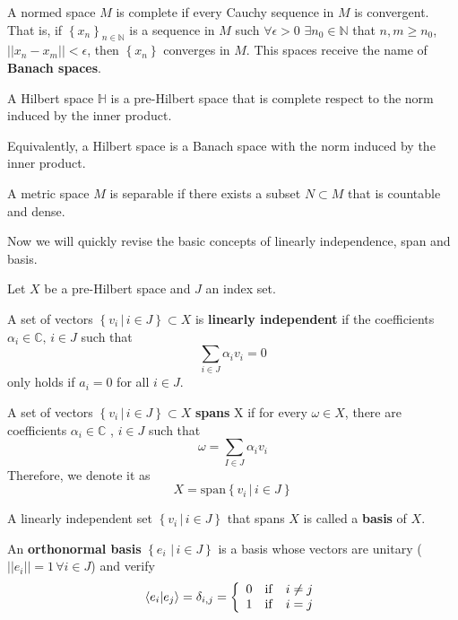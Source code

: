 \begin{definicion}
    A normed space $M$ is complete if every Cauchy sequence in $M$ is convergent. That is, if $\left\lbrace x_n\right\rbrace_{n \in \mathbb{N}}$ is a sequence in $M$ such $\forall \epsilon >0\,\,\exists n_0 \in \mathbb{N}$ that $n,m \geq n_0$, $||x_n - x_m|| < \epsilon$, then $\left\lbrace x_n \right\rbrace$ converges in $M$. 
    This spaces receive the name of \textbf{Banach spaces}. 
\end{definicion}

\begin{definicion} 
    A Hilbert space $\mathbb{H}$ is a pre-Hilbert space that is complete respect to the norm induced by the inner product.
\end{definicion}

Equivalently, a Hilbert space is a Banach space with the norm induced by the inner product. 

\begin{definicion}
    A metric space $M$ is separable if there exists a subset $N \subset M$ that is countable and dense.
\end{definicion}

Now we will quickly revise the basic concepts of linearly independence, span and basis.
\begin{definicion}
    Let $X$ be a pre-Hilbert space and $J$ an index set.
    
    A set of vectors $\left\lbrace v_i \, | \, i \in J\right \rbrace \subset X$ is \textbf{linearly independent} if the coefficients $\alpha_i \in \mathbb{C},\, i \in J$ such that
    $$\sum_{i \in J}\alpha_i v_i = 0$$
    only holds if $a_i=0$ for all $i\in J$.
    
    A set of vectors $\left\lbrace v_i \, | \, i \in J\right \rbrace \subset X$ \textbf{spans} X if for every $\omega \in X$, there are coefficients $\alpha_i \in \mathbb{C}$ , $ i\in J$ such that
    $$\omega =\sum_{I \in J} \alpha_i v_i$$ Therefore, we denote it as $$X = \mathrm{span}\left\lbrace v_i \, | \, i \in J\right \rbrace$$

    A linearly independent set $\left\lbrace v_i \, | \, i \in J\right \rbrace$ that spans $X$ is called a \textbf{basis} of $X$. 

    An \textbf{orthonormal basis} $\left\lbrace e_i \,\, | \, i \in J\right \rbrace $ is a basis whose vectors are unitary ($||e_i||=1\, \forall i \in J$) and verify
    $$\braket{e_i|e_j}=\delta_{i,j}=
    \left\{ \begin{array}{lcc} 
    0 & \mathrm{if} & i \neq j \\
    1 & \mathrm{if} & i = j 
    \end{array} \right.$$
\end{definicion}

